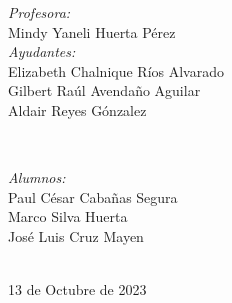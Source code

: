 \begin{titlepage}
\vspace{10mm}
\begin{minipage}{0.7\textwidth}
    \begin{flushleft} \large
        \emph{Profesora:}\\
            Mindy Yaneli Huerta Pérez \\
            \vspace{3mm}
            \emph{Ayudantes:}\\
            Elizabeth Chalnique Ríos Alvarado \\
            Gilbert Raúl Avendaño Aguilar \\
            Aldair Reyes Gónzalez
    \end{flushleft}
\end{minipage}
\\
\vspace{20mm}
\begin{minipage}{0.4\textwidth}
    \begin{flushright} \large
    \centering
        \emph{Alumnos:} \\ %
        \vspace{4mm}
        Paul César Cabañas Segura\\
        \vspace{3mm}
        Marco Silva Huerta \\                
        \vspace{3mm}        
        José Luis Cruz Mayen
    \end{flushright}
\end{minipage}\\[1.5cm]
\makeatother
{\large 13 de Octubre de 2023}\\[2cm]
\vfill 
\end{titlepage}